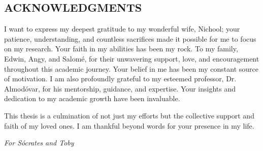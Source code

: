 



\vspace*{0.5in}
\begin{center}
\section*{ACKNOWLEDGMENTS}
\end{center}


\noindent
I want to express my deepest gratitude to my wonderful wife, Nichool; your patience, understanding, and countless sacrifices made it possible for me to focus on my research. Your faith in my abilities has been my rock. To my family, Edwin, Angy, and Salomé, for their unwavering support, love, and encouragement throughout this academic journey. Your belief in me has been my constant source of motivation. I am also profoundly grateful to my esteemed professor, Dr. Almodóvar, for his mentorship, guidance, and expertise. Your insights and dedication to my academic growth have been invaluable.

This thesis is a culmination of not just my efforts but the collective support and faith of my loved ones. I am thankful beyond words for your presence in my life. 


\newpage



\vspace*{2in}
\begin{center}
\emph{For Sócrates and Toby} %
\end{center}
